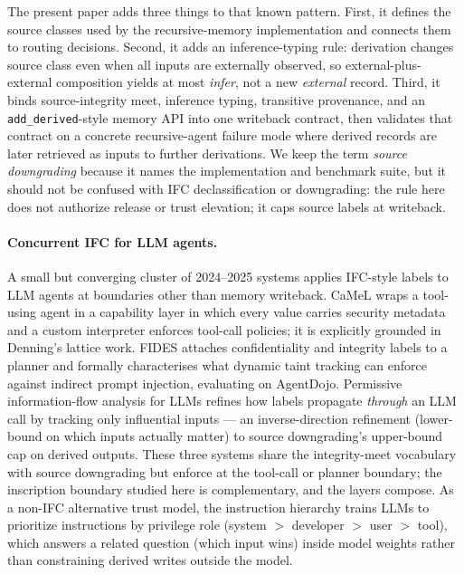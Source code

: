 \documentclass[11pt]{article}
\begin{document}
The present paper adds three things to that known pattern. First, it defines the source classes used by the recursive-memory implementation and connects them to routing decisions. Second, it adds an inference-typing rule: derivation changes source class even when all inputs are externally observed, so external-plus-external composition yields at most \emph{infer}, not a new \emph{external} record. Third, it binds source-integrity meet, inference typing, transitive provenance, and an \texttt{add\_derived}-style memory API into one writeback contract, then validates that contract on a concrete recursive-agent failure mode where derived records are later retrieved as inputs to further derivations. We keep the term \emph{source downgrading} because it names the implementation and benchmark suite, but it should not be confused with IFC declassification or downgrading: the rule here does not authorize release or trust elevation; it caps source labels at writeback.

\paragraph{Concurrent IFC for LLM agents.} A small but converging cluster of 2024--2025 systems applies IFC-style labels to LLM agents at boundaries other than memory writeback. CaMeL \cite{Debenedetti2025CaMeL} wraps a tool-using agent in a capability layer in which every value carries security metadata and a custom interpreter enforces tool-call policies; it is explicitly grounded in Denning's lattice work. FIDES \cite{Costa2025FIDES} attaches confidentiality and integrity labels to a planner and formally characterises what dynamic taint tracking can enforce against indirect prompt injection, evaluating on AgentDojo. Permissive information-flow analysis for LLMs \cite{Siddiqui2024Permissive} refines how labels propagate \emph{through} an LLM call by tracking only influential inputs --- an inverse-direction refinement (lower-bound on which inputs actually matter) to source downgrading's upper-bound cap on derived outputs. These three systems share the integrity-meet vocabulary with source downgrading but enforce at the tool-call or planner boundary; the inscription boundary studied here is complementary, and the layers compose. As a non-IFC alternative trust model, the instruction hierarchy \cite{Wallace2024InstructionHierarchy} trains LLMs to prioritize instructions by privilege role (system $>$ developer $>$ user $>$ tool), which answers a related question (which input wins) inside model weights rather than constraining derived writes outside the model.
\end{document}
